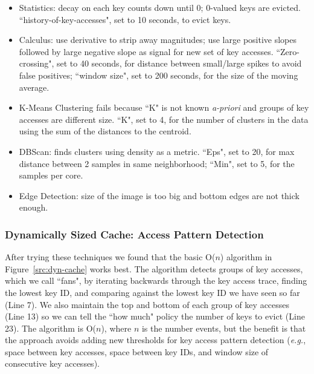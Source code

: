 \begin{itemize}

  \item Statistics: decay on each key counts down until 0; 0-valued keys are
evicted.  ``history-of-key-accesses", set to 10 seconds, to evict keys.

  \item Calculus: use derivative to strip away magnitudes; use large positive
slopes followed by large negative slope as signal for new set of key accesses.
``Zero-crossing", set to 40 seconds, for distance between small/large spikes to
avoid false positives; ``window size", set to 200 seconds, for the size of the
moving average.

  \item K-Means Clustering fails because ``K" is not known {\it a-priori} and
groups of key accesses are different size. ``K", set to 4, for the number of clusters in the data
using the sum of the distances to the centroid.

  \item DBScan: finds clusters using density as a metric. ``Eps", set to 20, for
max distance between 2 samples in same neighborhood; ``Min", set to 5, for the
samples per core.

  \item Edge Detection: size of the image is too big and bottom edges are
not thick enough.

\end{itemize}

\subsubsection{Dynamically Sized Cache: Access Pattern Detection}
\label{sec:regime-detection}

After trying these techniques we found that the basic O(\(n\)) algorithm in
Figure~\ref{src:dyn-cache} works best. The algorithm detects groups of key
accesses, which we call ``fans", by iterating backwards through the key access
trace, finding the lowest key ID, and comparing against the lowest key ID we
have seen so far (Line 7). We also maintain the top and bottom of each group of
key accesses (Line 13) so we can tell the ``how much" policy the number of keys
to evict (Line 23).  The algorithm is O(\(n\)), where \(n\) is the number
events, but the benefit is that the approach avoids adding new thresholds for
key access pattern detection ({\it e.g.}, space between key accesses, space
between key IDs, and window size of consecutive key accesses).

